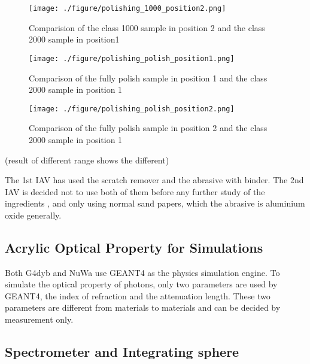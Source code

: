 \begin{figure}[h]
    \centering
    \texttt{[image: ./figure/polishing\_1000\_position2.png]}
    \caption{Comparision of the class 1000 sample in position 2 and the class 2000 sample in position1}
    \label{polishing_1000_position2.png}
    \end{figure}

\begin{figure}[h]
    \centering
    \texttt{[image: ./figure/polishing\_polish\_position1.png]}
    \caption{Comparison of the fully polish sample in position 1 and the class 2000 sample in position 1}
    \label{polishing_polish_position1.png}
    \end{figure}

\begin{figure}[h]
    \centering
    \texttt{[image: ./figure/polishing\_polish\_position2.png]}
    \caption{Comparison of the fully polish sample in position 2 and the class 2000 sample in position 1}
    \label{polishing_polish_position2.png}
    \end{figure}


(result of different range shows the different)

The 1st IAV has used the scratch remover and the abrasive with binder. The 2nd
IAV is decided not to use both of them before any further study of the ingredients
, and only using normal sand papers, which the abrasive is aluminium oxide generally. 


\subsection {Acrylic Optical Property for Simulations}

Both G4dyb and NuWa use GEANT4 as the physics simulation engine.
To simulate the optical property of photons, only two parameters are used
by GEANT4, the index of refraction and the attenuation length. These two
parameters are different from materials to materials and can be decided
by measurement only.


\subsection {Spectrometer and Integrating sphere}

